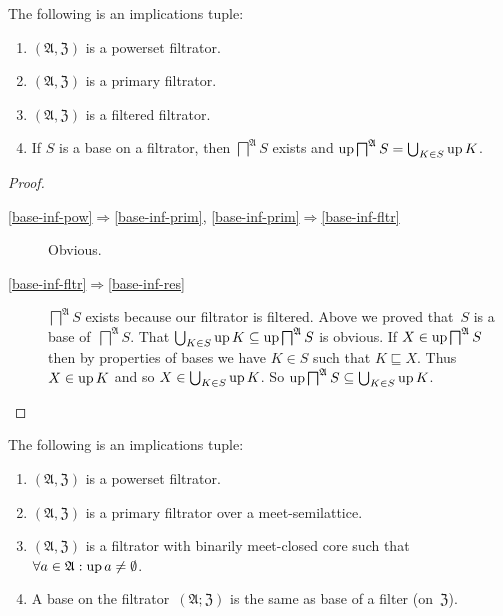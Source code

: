 \begin{prop}
The following is an implications tuple:
  \begin{enumerate}
  \item\label{base-inf-pow} $(\mathfrak{A},\mathfrak{Z})$ is a powerset filtrator.
  \item\label{base-inf-prim} $(\mathfrak{A},\mathfrak{Z})$ is a primary filtrator.
  \item\label{base-inf-fltr} $(\mathfrak{A},\mathfrak{Z})$ is a filtered filtrator.
  \item\label{base-inf-res} If $S$ is a base on a filtrator, then $\bigsqcap^{\mathfrak{A}} S$ exists and
    $\operatorname{up} \bigsqcap^{\mathfrak{A}} S = \bigcup_{K\in S}\operatorname{up} K$.
  \end{enumerate}
\end{prop}

\begin{proof}
  ~
  \begin{description}
  \item[\ref{base-inf-pow}$\Rightarrow$\ref{base-inf-prim}, \ref{base-inf-prim}$\Rightarrow$\ref{base-inf-fltr}] Obvious.

  \item[\ref{base-inf-fltr}$\Rightarrow$\ref{base-inf-res}]
    $\bigsqcap^{\mathfrak{A}} S$ exists because our filtrator is filtered.
    Above we proved that~$S$ is a base of~$\bigsqcap^{\mathfrak{A}} S$.
    That $\bigcup_{K\in S}\operatorname{up} K \subseteq \operatorname{up} \bigsqcap^{\mathfrak{A}} S$ is obvious.
    If $X\in\operatorname{up}\bigsqcap^{\mathfrak{A}} S$ then by properties of bases we have
    $K\in S$ such that $K\sqsubseteq X$. Thus $X\in\operatorname{up} K$ and so $X\in\bigcup_{K\in S}\operatorname{up} K$.
    So $\operatorname{up} \bigsqcap^{\mathfrak{A}} S \subseteq \bigcup_{K\in S}\operatorname{up} K$.
  \end{description}
\end{proof}

\begin{prop}
The following is an implications tuple:
\begin{enumerate}
\item\label{same-base-prim} $(\mathfrak{A},\mathfrak{Z})$ is a powerset filtrator.
\item\label{same-base-flt} $(\mathfrak{A},\mathfrak{Z})$ is a primary filtrator over a meet-semilattice.
\item\label{same-base-mid} $(\mathfrak{A},\mathfrak{Z})$ is a filtrator with binarily meet-closed core such that
  $\forall a\in\mathfrak{A}:\operatorname{up} a\ne\emptyset$.
\item\label{same-base-res} A base on the filtrator~$(\mathfrak{A};\mathfrak{Z})$ is the same
as base of a filter (on~$\mathfrak{Z}$).
\end{enumerate}
\end{prop}

